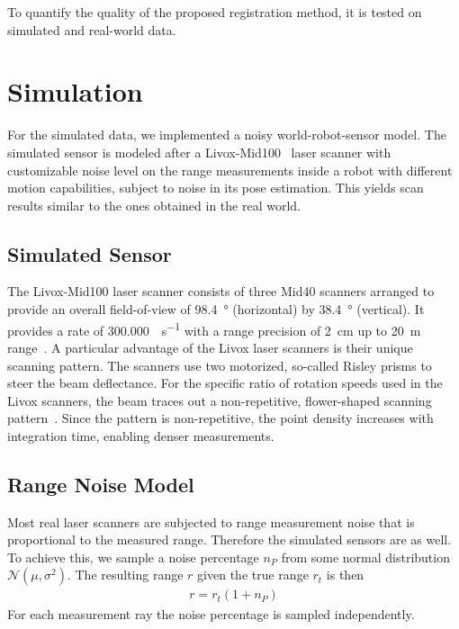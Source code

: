 To quantify the quality of the proposed registration method, it is tested on simulated and real-world data. 

\section{Simulation}

For the simulated data, we implemented a noisy world-robot-sensor model.  
The simulated sensor is modeled after a Livox-Mid100~\cite{LivoxMid40-100} laser scanner with customizable noise level on the range measurements inside a robot with different motion capabilities, subject to noise in its pose estimation. 
This yields scan results similar to the ones obtained in the real world.

\subsection{Simulated Sensor}

The Livox-Mid100 laser scanner consists of three Mid40 scanners arranged to provide an overall field-of-view of \SI{98.4}{\degree} (horizontal) by \SI{38.4}{\degree} (vertical).
It provides a rate of \SI[per-mode=symbol]{300,000}{\pts\per\second} with a range precision of \SI{2}{\centi\meter} up to \SI{20}{\meter} range~\cite{LivoxMid40-100}.
A particular advantage of the Livox laser scanners is their unique scanning pattern.
The scanners use two motorized, so-called Risley prisms to steer the beam deflectance.
For the specific ratio of rotation speeds used in the Livox scanners, the beam traces out a non-repetitive, flower-shaped scanning pattern~\cite{thorlabs}.
Since the pattern is non-repetitive, the point density increases with integration time, enabling denser measurements.

\subsection{Range Noise Model}

Most real laser scanners are subjected to range measurement noise that is proportional to the measured range. 
Therefore the simulated sensors are as well. 
To achieve this, we sample a noise percentage $n_P$ from some normal distribution $\mathcal{N}(\mu,\sigma^2)$. 
The resulting range $r$ given the true range $r_t$ is then
\begin{align}
	r = r_t(1+n_P)
\end{align}
For each measurement ray the noise percentage is sampled independently. 

